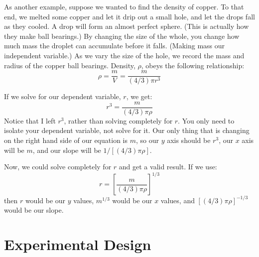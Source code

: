 \documentclass[twoside,11pt,ShortChapTitles]{BYUTextbook}
\begin{document}
As another example, suppose we wanted to find the density of copper.  To that end, we melted some copper and let it drip out a small hole, and let the drops fall as they cooled.  A drop will form an almost perfect sphere. (This is actually how they make ball bearings.)  By changing the size of the whole, you change how much mass the droplet can accumulate before it falls.  (Making mass our independent variable.)  As we vary the size of the hole, we record the mass and radius of the copper ball bearings.  Density, $\rho$, obeys the following relationship:
\[\rho = \frac{m}{V}=\frac{m}{(4/3)\pi r^3}\]

If we solve for our dependent variable, $r$, we get:
\[r^3=\frac{m}{(4/3)\pi\rho}\]
Notice that I left $r^3$, rather than solving completely for $r$.  You only need to isolate your dependent variable, not solve for it.  Our only thing that is changing on the right hand side of our equation is $m$, so our $y$ axis should be $r^3$, our $x$ axis will be $m$, and our slope will be $1/\left[\left(4/3\right)\pi\rho\right]$.

Now, we could solve completely for $r$ and get a valid result.  If we use:
\[r=\left[\frac{m}{(4/3)\pi\rho}\right]^{1/3}\]
then $r$ would be our $y$ values, $m^{1/3}$ would be our $x$ values, and $\left[\left(4/3\right)\pi\rho\right]^{-1/3}$ would be our slope.

\section{Experimental Design}
\end{document}
